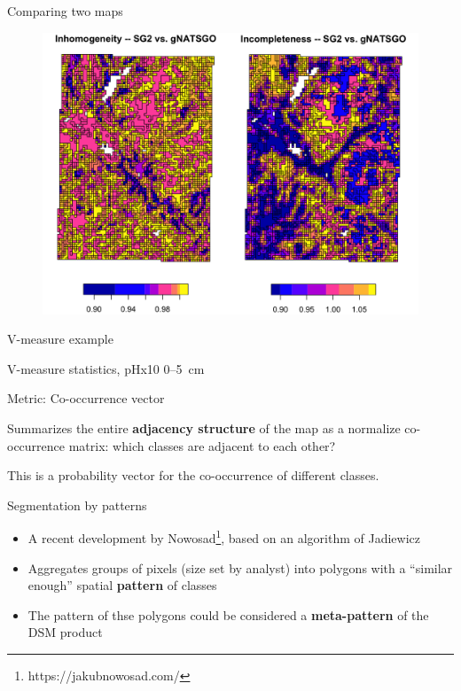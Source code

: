 \documentclass[aspectratio=169]{beamer}
\begin{document}
\begin{frame}{Comparing two maps}
    \begin{figure}
        \centering        \includegraphics[height=0.8\textheight]{graphics_david/Fig16.png}
    \end{figure}
\end{frame}

\begin{frame}{V-measure example}
   
\par
V-measure statistics, pHx10 0--5~cm
\end{frame}

\begin{frame}{Metric: Co-occurrence vector}
\par
    Summarizes the entire \textbf{adjacency structure} of the map as a normalize co-occurrence matrix: which classes are adjacent to each other?
  \par  
    This is a probability vector for the co-occurrence of different classes.
\end{frame}
\begin{frame}{Segmentation by patterns}
\begin{itemize}
    \item 
A recent development by Nowosad\footnote{https://jakubnowosad.com/}, based on an algorithm of Jadiewicz    
\item Aggregates groups of pixels (size set by analyst) into polygons with a ``similar enough'' spatial \textbf{pattern} of classes
\item The pattern of thse polygons could be considered a \textbf{meta-pattern} of the DSM product
\end{itemize}
\end{frame}
\end{document}
